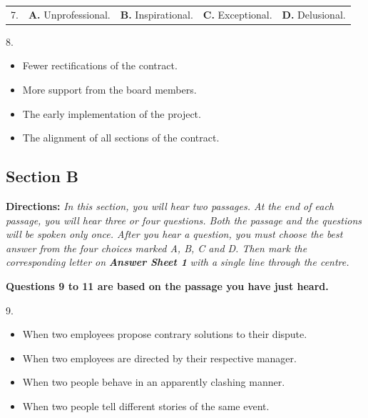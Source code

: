 \documentclass[UTF8,11pt]{ctexart}
\begin{document}
\noindent\begin{tabularx}{\linewidth}{@{}lXXXX@{}}7. & \textbf{A.} Unprofessional. & \textbf{B.} Inspirational. & \textbf{C.} Exceptional. & \textbf{D.} Delusional.\\\end{tabularx}\par

8.


\begin{itemize}[leftmargin=2em,itemsep=.2em,topsep=.4em]\item[A.] Fewer rectifications of the contract.
\item[B.] More support from the board members.
\item[C.] The early implementation of the project.
\item[D.] The alignment of all sections of the contract.
\end{itemize}

\subsection*{\textbf{Section B}}


\textbf{Directions:} \textit{In this section, you will hear two passages. At the end of each passage, you will hear three or four} \textit{questions. Both the passage and the questions will be spoken only once. After you hear a question, you must choose the} \textit{best answer from the four choices marked A, B, C and D. Then mark the corresponding letter on }\textbf{\textit{Answer Sheet 1}}\textit{ with a} \textit{single line through the centre.}


\textbf{Questions 9 to 11 are based on the passage you have just heard.}


9.


\begin{itemize}[leftmargin=2em,itemsep=.2em,topsep=.4em]\item[A.] When two employees propose contrary solutions to their dispute.
\item[B.] When two employees are directed by their respective manager.
\end{itemize}

\begin{itemize}[leftmargin=2em,itemsep=.2em,topsep=.4em]\item[C.] When two people behave in an apparently clashing manner.
\item[D.] When two people tell different stories of the same event.
\end{itemize}
\end{document}
